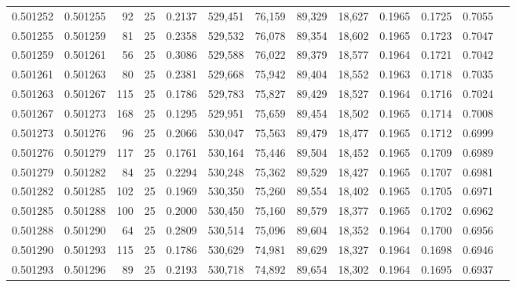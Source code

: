 \begin{tabular}{rrrrrrrrrrrrr}
0.501252 & 0.501255 &  92 &  25 &                                     0.2137 & 529,451 &  76,159 &  89,329 &  18,627 & 0.1965 & 0.1725 & 0.7055 \\
0.501255 & 0.501259 &  81 &  25 &                                     0.2358 & 529,532 &  76,078 &  89,354 &  18,602 & 0.1965 & 0.1723 & 0.7047 \\
0.501259 & 0.501261 &  56 &  25 &                                     0.3086 & 529,588 &  76,022 &  89,379 &  18,577 & 0.1964 & 0.1721 & 0.7042 \\
0.501261 & 0.501263 &  80 &  25 &                                     0.2381 & 529,668 &  75,942 &  89,404 &  18,552 & 0.1963 & 0.1718 & 0.7035 \\
0.501263 & 0.501267 & 115 &  25 &                                     0.1786 & 529,783 &  75,827 &  89,429 &  18,527 & 0.1964 & 0.1716 & 0.7024 \\
0.501267 & 0.501273 & 168 &  25 &                                     0.1295 & 529,951 &  75,659 &  89,454 &  18,502 & 0.1965 & 0.1714 & 0.7008 \\
0.501273 & 0.501276 &  96 &  25 &                                     0.2066 & 530,047 &  75,563 &  89,479 &  18,477 & 0.1965 & 0.1712 & 0.6999 \\
0.501276 & 0.501279 & 117 &  25 &                                     0.1761 & 530,164 &  75,446 &  89,504 &  18,452 & 0.1965 & 0.1709 & 0.6989 \\
0.501279 & 0.501282 &  84 &  25 &                                     0.2294 & 530,248 &  75,362 &  89,529 &  18,427 & 0.1965 & 0.1707 & 0.6981 \\
0.501282 & 0.501285 & 102 &  25 &                                     0.1969 & 530,350 &  75,260 &  89,554 &  18,402 & 0.1965 & 0.1705 & 0.6971 \\
0.501285 & 0.501288 & 100 &  25 &                                     0.2000 & 530,450 &  75,160 &  89,579 &  18,377 & 0.1965 & 0.1702 & 0.6962 \\
0.501288 & 0.501290 &  64 &  25 &                                     0.2809 & 530,514 &  75,096 &  89,604 &  18,352 & 0.1964 & 0.1700 & 0.6956 \\
0.501290 & 0.501293 & 115 &  25 &                                     0.1786 & 530,629 &  74,981 &  89,629 &  18,327 & 0.1964 & 0.1698 & 0.6946 \\
0.501293 & 0.501296 &  89 &  25 &                                     0.2193 & 530,718 &  74,892 &  89,654 &  18,302 & 0.1964 & 0.1695 & 0.6937 \\

\end{tabular}

